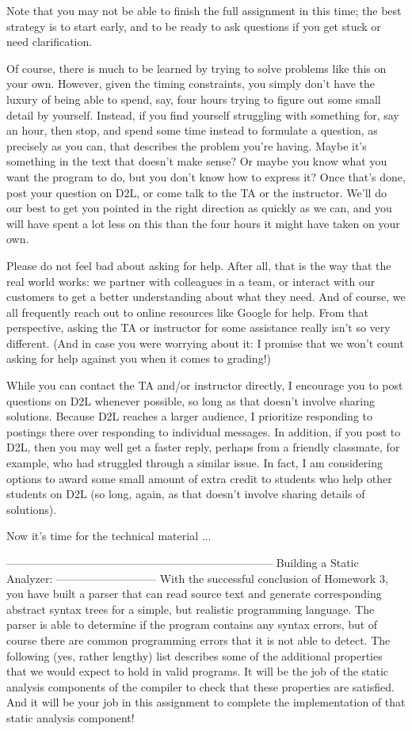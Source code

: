 \documentclass{article}
\begin{document}
Note that you may not be able to finish the full assignment in this
time; the best strategy is to start early, and to be ready to ask
questions if you get stuck or need clarification.

Of course, there is much to be learned by trying to solve problems
like this on your own.  However, given the timing constraints, you
simply don't have the luxury of being able to spend, say, four hours
trying to figure out some small detail by yourself.  Instead, if you
find yourself struggling with something for, say an hour, then stop,
and spend some time instead to formulate a question, as precisely as
you can, that describes the problem you're having.  Maybe it's
something in the text that doesn't make sense?  Or maybe you know
what you want the program to do, but you don't know how to express
it?  Once that's done, post your question on D2L, or come talk to the
TA or the instructor.  We'll do our best to get you pointed in the
right direction as quickly as we can, and you will have spent a lot
less on this than the four hours it might have taken on your own.

Please do not feel bad about asking for help.  After all, that is the
way that the real world works: we partner with colleagues in a team,
or interact with our customers to get a better understanding about
what they need.  And of course, we all frequently reach out to online
resources like Google for help.  From that perspective, asking the TA
or instructor for some assistance really isn't so very different.
(And in case you were worrying about it: I promise that we won't
count asking for help against you when it comes to grading!)

While you can contact the TA and/or instructor directly, I encourage
you to post questions on D2L whenever possible, so long as that
doesn't involve sharing solutions.  Because D2L reaches a larger
audience, I prioritize responding to postings there over responding
to individual messages.  In addition, if you post to D2L, then you
may well get a faster reply, perhaps from a friendly classmate, for
example, who had struggled through a similar issue.  In fact, I am
considering options to award some small amount of extra credit to
students who help other students on D2L (so long, again, as that
doesn't involve sharing details of solutions).

Now it's time for the technical material ...

------------------------------------------------------------------------
Building a Static Analyzer:
---------------------------
With the successful conclusion of Homework 3, you have built a parser
that can read source text and generate corresponding abstract syntax
trees for a simple, but realistic programming language.  The parser
is able to determine if the program contains any syntax errors, but
of course there are common programming errors that it is not able to
detect.  The following (yes, rather lengthy) list describes some of
the additional properties that we would expect to hold in valid
programs.  It will be the job of the static analysis components of
the compiler to check that these properties are satisfied.  And it
will be your job in this assignment to complete the implementation of
that static analysis component!
\end{document}
